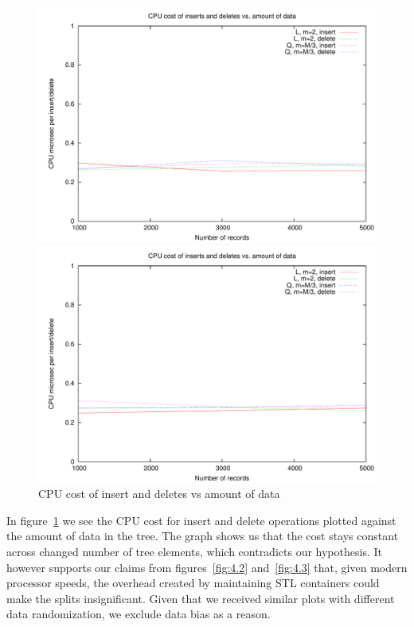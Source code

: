 \begin{figure}
\centering
\begin{minipage}{0.49\textwidth}
\centering
\includegraphics[width=\textwidth]{fig/random/figure-4-7.pdf}
\end{minipage}
\begin{minipage}{0.49\textwidth}
\centering
\includegraphics[width=\textwidth]{fig/usppp/figure-4-7.pdf}
\end{minipage}
\caption{CPU cost of insert and deletes vs amount of data}
\label{fig:4.7}
\end{figure}

In figure~\ref{fig:4.7} we see the CPU cost for insert and delete operations plotted against the amount of data in the tree. The graph shows us that the cost stays constant across changed number of tree elements, which contradicts our hypothesis. It however supports our claims from figures~\ref{fig:4.2} and~\ref{fig:4.3} that, given modern processor speeds, the overhead created by maintaining STL containers could make the splits insignificant. Given that we received similar plots with different data randomization, we exclude data bias as a reason.

